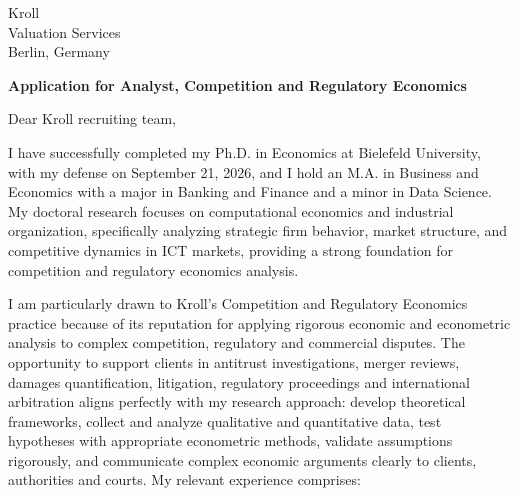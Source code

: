 \documentclass[11pt]{article}
\begin{document}
\vspace{0.1cm}

\vspace{0.1cm}

\noindent
Kroll \\
Valuation Services \\
Berlin, Germany

\vspace{0.12cm}

\noindent
\textbf{Application for Analyst, Competition and Regulatory Economics}

\vspace{0.1cm}

\noindent Dear Kroll recruiting team,

I have successfully completed my Ph.D. in Economics at Bielefeld University, with my defense on September 21, 2026, 
and I hold an M.A. in Business and Economics with a major in Banking and Finance and a minor in Data Science. 
My doctoral research focuses on computational economics and industrial organization, 
specifically analyzing strategic firm behavior, market structure, and competitive dynamics in ICT markets, 
providing a strong foundation for competition and regulatory economics analysis.

I am particularly drawn to Kroll's Competition and Regulatory Economics practice because of its reputation for applying rigorous economic and econometric analysis to complex competition, regulatory and commercial disputes. 
The opportunity to support clients in antitrust investigations, merger reviews, damages quantification, litigation, regulatory proceedings and international arbitration aligns perfectly with my research approach: 
develop theoretical frameworks, collect and analyze qualitative and quantitative data, test hypotheses with appropriate econometric methods, 
validate assumptions rigorously, and communicate complex economic arguments clearly to clients, authorities and courts.
My relevant experience comprises:
\end{document}
